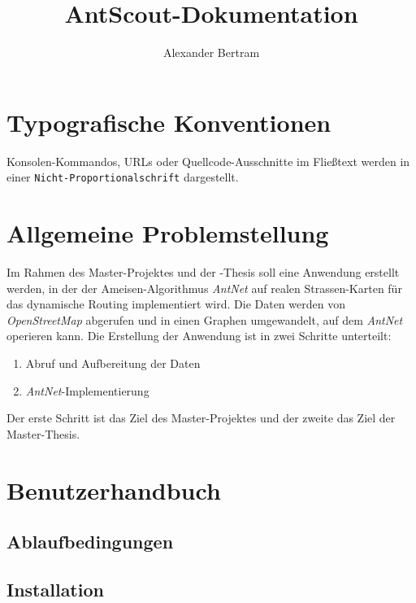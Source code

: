 \documentclass[a4paper,10pt]{scrreprt}
\title{AntScout-Dokumentation}
\author{Alexander Bertram}
\begin{document}
\maketitle



\printglossary[
  title = Abkürzungsverzeichnis,
  toctitle = Abkürzungsverzeichnis
]

\chapter{Typografische Konventionen}
\label{chap:typografische-konventionen}

Konsolen-Kommandos, URLs oder Quellcode-Ausschnitte im Fließtext werden in einer \texttt{Nicht-Proportionalschrift} dargestellt.

\chapter{Allgemeine Problemstellung}
\label{chap:allgemeine-problemstellung}

Im Rahmen des Master-Projektes und der -Thesis soll eine Anwendung erstellt werden, in der der Ameisen-Algorithmus \textit{AntNet} auf realen Strassen-Karten für das dynamische Routing implementiert wird.
Die Daten werden von \textit{OpenStreetMap} abgerufen und in einen Graphen umgewandelt, auf dem \textit{AntNet} operieren kann.
Die Erstellung der Anwendung ist in zwei Schritte unterteilt:

\begin{enumerate}
  \item Abruf und Aufbereitung der Daten
  \item \textit{AntNet}-Implementierung
\end{enumerate}

Der erste Schritt ist das Ziel des Master-Projektes und der zweite das Ziel der Master-Thesis.

\chapter{Benutzerhandbuch}
\label{chap:benutzerhandbuch}

\section{Ablaufbedingungen}
\label{sec:ablaufbedingungen}

\section{Installation}
\label{sec:installation}
\end{document}
